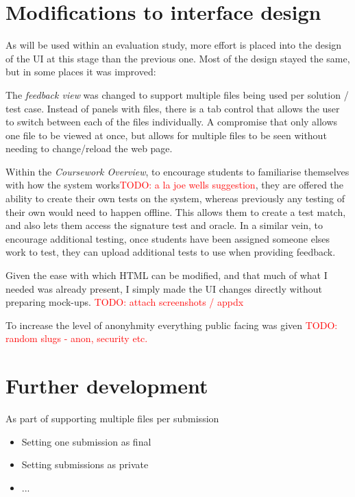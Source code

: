 \documentclass[a4paper,11pt]{report}
\newcommand{\todo}[1]{\textcolor{red}{TODO: #1}}
\begin{document}
\section{Modifications to interface design}
As will be used within an evaluation study, more effort is placed into the design of the UI at this stage than the previous one. Most of the design stayed the same, but in some places it was improved:\par
The \textit{feedback view} was changed to support multiple files being used per solution / test case. Instead of panels with files, there is a tab control that allows the user to switch between each of the files individually. A compromise that only allows one file to be viewed at once, but allows for multiple files to be seen without needing to change/reload the web page.\par
Within the \textit{Coursework Overview}, to encourage students to familiarise themselves with how the system works\todo{a la joe wells suggestion}, they are offered the ability to create their own tests on the system, whereas previously any testing of their own would need to happen offline. This allows them to create a test match, and also lets them access the signature test and oracle. In a similar vein, to encourage additional testing, once students have been assigned someone elses work to test, they can upload additional tests to use when providing feedback.\par
Given the ease with which HTML can be modified, and that much of what I needed was already present, I simply made the UI changes directly without preparing mock-ups. \todo{attach screenshots / appdx}\par
To increase the level of anonyhmity everything public facing was given \todo{random slugs - anon, security etc.}
\section{Further development}
As part of supporting multiple files per submission
\begin{itemize}
\item Setting one submission as final
\item Setting submissions as private
\item ...
\end{itemize}
\end{document}
